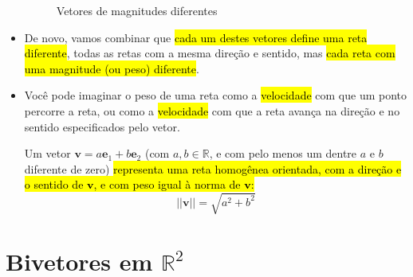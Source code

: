 \documentclass[
  letterpaper,
  DIV=11,
  numbers=noendperiod]{scrreprt}
\begin{document}
\begin{itemize}
\begin{figure}[htb]
{  }

  \caption{\label{fig-vetores}Vetores de magnitudes diferentes}

  \end{figure}
\item
  De novo, vamos combinar que {\hl{cada um destes vetores define uma
  reta diferente}}, todas as retas com a mesma direção e sentido, mas
  {\hl{cada reta com uma magnitude (ou peso) diferente}}.
\item
  Você pode imaginar o peso de uma reta como a {\hl{velocidade}} com que
  um ponto percorre a reta, ou como a {\hl{velocidade}} com que a reta
  avança na direção e no sentido especificados pelo vetor.

  \begin{tcolorbox}[standard jigsaw,bottomtitle=1mm, opacityback=0, title=\textcolor{quarto-callout-note-color}{\faInfo}\hspace{0.5em}{Resumindo: vetores \(=\) retas homogêneas orientadas e com peso}, colframe=quarto-callout-note-color-frame, opacitybacktitle=0.6, left=2mm, coltitle=black, rightrule=.15mm, titlerule=0mm, colback=white, colbacktitle=quarto-callout-note-color!10!white, arc=.35mm, bottomrule=.15mm, toprule=.15mm, leftrule=.75mm, toptitle=1mm]
  Um vetor $\mathbf{v} = a\mathbf{e}_{1} + b\mathbf{e}_{2}$ (com
  $a, b \in \mathbb{R}$, e com pelo menos um dentre $a$ e $b$ diferente
  de zero) {\hl{representa uma reta homogênea orientada, com a direção e
  o sentido de $\mathbf{v}$, e com peso igual à norma de $\mathbf{v}$:}}
  \[
  ||\mathbf{v}|| = \sqrt{a^2 + b^2}
  \]
  \end{tcolorbox}
\end{itemize}

\hypertarget{bivetores-em-mathbbr2}{%
\section{\texorpdfstring{Bivetores em
$\mathbb{R}^2$}{Bivetores em }}\label{bivetores-em-mathbbr2}}
\end{document}
